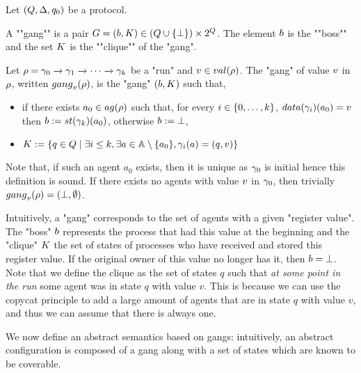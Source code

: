 \begin{definition}
	Let $(Q,\Delta, q_0)$ be a protocol.

	A ""gang"" is a pair $\gang = (\boss, \clique) \in (Q \cup \set{\noboss}) \times \powerset{Q}$. The element $\boss$ is the ""boss"" and the set $\clique$ is the ""clique"" of the "gang". %

	Let $\rho = \gamma_0 \xrightarrow{} \gamma_1 \xrightarrow{} \cdots \xrightarrow{} \gamma_k$ be a "run" and $\aval \in \valsof{\run}$. The "gang" of value $v$ in $\rho$, written $\gangof{\aval}{\run}$, is the "gang" $(\boss, \clique)$ such that, 
	\begin{itemize}
	\item if there exists $a_0 \in \agentsof{\run}$ such that, 
	for every 
	$i \in \{0,\dots,k\}$, 
	$\data{\config_i}(a_0) = \aval$ then $\boss := \st{\config_k}(a_0)$, otherwise $\boss := \noboss$, 
	\item  $\clique := \set{q \in Q \mid \exists i \leq k, \exists a \in \agents\setminus \set{a_0}, \config_i(a) = (q,\aval)}$ %
	\end{itemize}
Note that, if such an agent $a_0$ exists, then it is unique as $\gamma_0$ is initial hence this definition is sound. If there exists no agents with value $v$ in $\gamma_0$, then trivially $\gangof{\aval}{\run} = (\noboss, \emptyset)$. 
\end{definition} 

Intuitively, a "gang" corresponds to the set of agents with a given "register value". The "boss" $\boss$ represents the process that had this value at the beginning and the "clique" $\clique$ the set of states of processes who have received and stored this register value. If the original owner of this value no longer has it, then $\boss = \noboss$. Note that we define the clique as the set of states $q$ such that \emph{at some point in the run} some agent was in state $q$ with value $v$. This is because we can use the copycat principle to add a large amount of agents that are in state $q$ with value $v$, and thus we can assume that there is always one.

We now define an abstract semantics based on gangs: intuitively, an abstract configuration is composed of a gang along with a set of states which are known to be coverable.


